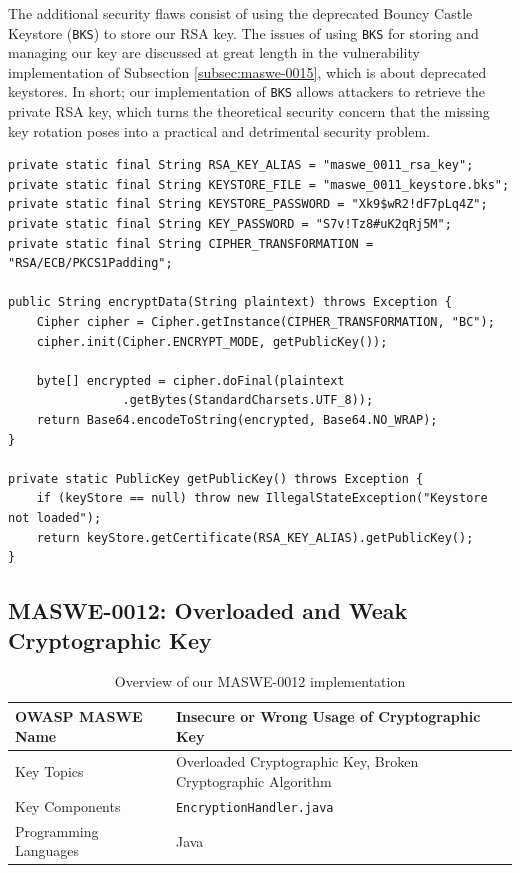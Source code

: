 The additional security flaws consist of using the deprecated Bouncy Castle Keystore (\texttt{BKS}) to store our RSA key. The issues of using \texttt{BKS} for storing and managing our key are discussed at great length in the vulnerability implementation of Subsection \ref{subsec:maswe-0015}, which is about deprecated keystores. In short; our implementation of \texttt{BKS} allows attackers to retrieve the private RSA key, which turns the theoretical security concern that the missing key rotation poses into a practical and detrimental security problem.

\begin{lstlisting}[style=JavaStyle, float=tbh, captionpos=b, caption={Using \texttt{BKS} for RSA encryption with no key rotation}, label={lst:maswe0011NoRotationBks}]
private static final String RSA_KEY_ALIAS = "maswe_0011_rsa_key";
private static final String KEYSTORE_FILE = "maswe_0011_keystore.bks";
private static final String KEYSTORE_PASSWORD = "Xk9$wR2!dF7pLq4Z";
private static final String KEY_PASSWORD = "S7v!Tz8#uK2qRj5M";
private static final String CIPHER_TRANSFORMATION = "RSA/ECB/PKCS1Padding";

public String encryptData(String plaintext) throws Exception {
    Cipher cipher = Cipher.getInstance(CIPHER_TRANSFORMATION, "BC");
    cipher.init(Cipher.ENCRYPT_MODE, getPublicKey());

    byte[] encrypted = cipher.doFinal(plaintext
                .getBytes(StandardCharsets.UTF_8));
    return Base64.encodeToString(encrypted, Base64.NO_WRAP);
}

private static PublicKey getPublicKey() throws Exception {
    if (keyStore == null) throw new IllegalStateException("Keystore not loaded");
    return keyStore.getCertificate(RSA_KEY_ALIAS).getPublicKey();
}
\end{lstlisting}


\clearpage
\subsection{MASWE-0012: Overloaded and Weak Cryptographic Key}
\label{subsec:maswe-0012}

\begin{table}[H]
\centering
\renewcommand{\arraystretch}{1.3}
\begin{tabular}{p{5cm} p{8cm}} 
\toprule
OWASP MASWE Name & Insecure or Wrong Usage of Cryptographic Key \\ 
\midrule
Key Topics & Overloaded Cryptographic Key, Broken Cryptographic Algorithm \\
Key Components & \texttt{EncryptionHandler.java} \\
Programming Languages & Java \\ 
\bottomrule
\end{tabular}
\caption{Overview of our MASWE-0012 implementation}
\label{tab:maswe-0012}
\end{table}

